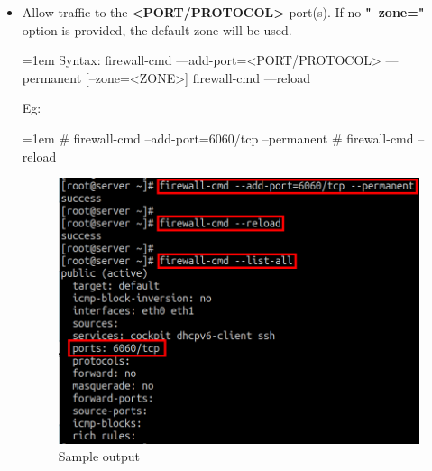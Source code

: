 \begin{flushleft}
\begin{itemize}
		\newpage
		\item Allow traffic to the \textbf{<PORT/PROTOCOL>} port(s). If no \textbf{"--zone="} option is provided, the default zone will be used.
		\bigskip
		\begin{tcolorbox}[breakable,notitle,boxrule=1pt,colback=pink,colframe=pink]
			\color{black}
			\font=1em
			Syntax: 
			\newline
			firewall-cmd ---add-port=<PORT/PROTOCOL> ---permanent [--zone=<ZONE>]
			\newline
			\newline
			firewall-cmd ---reload
			\font=4pt
		\end{tcolorbox}	
		Eg:
		\begin{tcolorbox}[breakable,notitle,boxrule=-0pt,colback=black,colframe=black]
			\color{green}
			\font=1em
			\# firewall-cmd --add-port=6060/tcp --permanent 
			\newline
			\# firewall-cmd --reload
			\font=4pt
		\end{tcolorbox}
		\begin{figure}[h!]
			\centering
			\includegraphics[scale=0.4]{content/chapter2/images/zones8.png}
			\caption{Sample output}
			\label{fig:zones8}
		\end{figure}
		

\end{itemize}
\end{flushleft}
